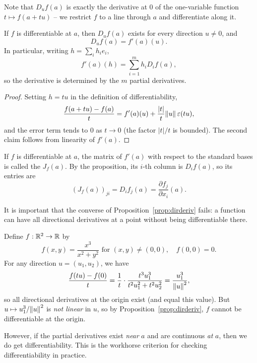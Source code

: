 \documentclass[a4paper]{scrartcl}
\begin{document}
Note that $D_u f(a)$ is exactly the derivative at $0$ of the one-variable function $t \mapsto f(a + tu)$ -- we restrict $f$ to a line through $a$ and differentiate along it.

\begin{proposition}\label{prop:dirderiv}
    If $f$ is differentiable at $a$, then $D_u f(a)$ exists for every direction $u \neq 0$, and
    $$
    D_u f(a) = f'(a)(u).
    $$
    In particular, writing $h = \sum_i h_i e_i$,
    $$
    f'(a)(h) = \sum_{i = 1}^m h_i D_i f(a),
    $$
    so the derivative is determined by the $m$ partial derivatives.
\end{proposition}
\begin{proof}
    Setting $h = tu$ in the definition of differentiability,
    $$
    \frac{f(a + tu) - f(a)}{t} = f'(a)(u) + \frac{|t|}{t}\norm{u} \, \varepsilon(tu),
    $$
    and the error term tends to $0$ as $t \rightarrow 0$ (the factor $|t|/t$ is bounded). The second claim follows from linearity of $f'(a)$.
\end{proof}

\begin{definition}
    If $f$ is differentiable at $a$, the matrix of $f'(a)$ with respect to the standard bases is called the  $J_f(a)$. By the proposition, its $i$-th column is $D_i f(a)$, so its entries are
    $$
    (J_f(a))_{ji} = D_i f_j(a) = \frac{\partial f_j}{\partial x_i}(a).
    $$
\end{definition}

It is important that the converse of Proposition~\ref{prop:dirderiv} fails: a function can have all directional derivatives at a point without being differentiable there.

\begin{example}
    Define $f: \mathbb{R}^2 \rightarrow \mathbb{R}$ by
    $$
    f(x, y) = \frac{x^3}{x^2 + y^2} \text{ for } (x, y) \neq (0,0), \quad f(0, 0) = 0.
    $$
    For any direction $u = (u_1, u_2)$, we have
    $$
    \frac{f(tu) - f(0)}{t} = \frac{1}{t}\cdot\frac{t^3u_1^3}{t^2 u_1^2 + t^2u_2^2} = \frac{u_1^3}{\norm{u}^2},
    $$
    so all directional derivatives at the origin exist (and equal this value). But $u \mapsto u_1^3/\norm{u}^2$ is \emph{not linear} in $u$, so by Proposition~\ref{prop:dirderiv}, $f$ cannot be differentiable at the origin.
\end{example}

However, if the partial derivatives exist \emph{near} $a$ and are continuous \emph{at} $a$, then we do get differentiability. This is the workhorse criterion for checking differentiability in practice.
\end{document}
